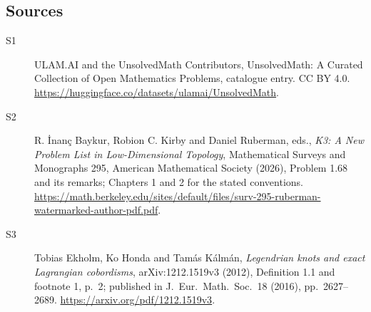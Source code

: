 \documentclass[11pt]{article}
\begin{document}
\subsection{Sources}
\begin{description}
\item[\hypertarget{source:statement:1}{S1}] ULAM.AI and the UnsolvedMath Contributors, UnsolvedMath: A Curated Collection of Open Mathematics Problems, catalogue entry. CC BY 4.0. \url{https://huggingface.co/datasets/ulamai/UnsolvedMath}.
\item[\hypertarget{source:statement:2}{S2}] R. İnanç Baykur, Robion C. Kirby and Daniel Ruberman, eds., \emph{K3: A New Problem List in Low-Dimensional Topology}, Mathematical Surveys and Monographs 295, American Mathematical Society (2026), Problem 1.68 and its remarks; Chapters 1 and 2 for the stated conventions. \url{https://math.berkeley.edu/sites/default/files/surv-295-ruberman-watermarked-author-pdf.pdf}.
\item[\hypertarget{source:statement:3}{S3}] Tobias Ekholm, Ko Honda and Tamás Kálmán, \emph{Legendrian knots and exact Lagrangian cobordisms}, arXiv:1212.1519v3 (2012), Definition 1.1 and footnote 1, p.\ 2; published in J.\ Eur.\ Math.\ Soc.\ 18 (2016), pp.\ 2627--2689. \url{https://arxiv.org/pdf/1212.1519v3}.
\end{description}
\label{end:statement}
\end{document}
